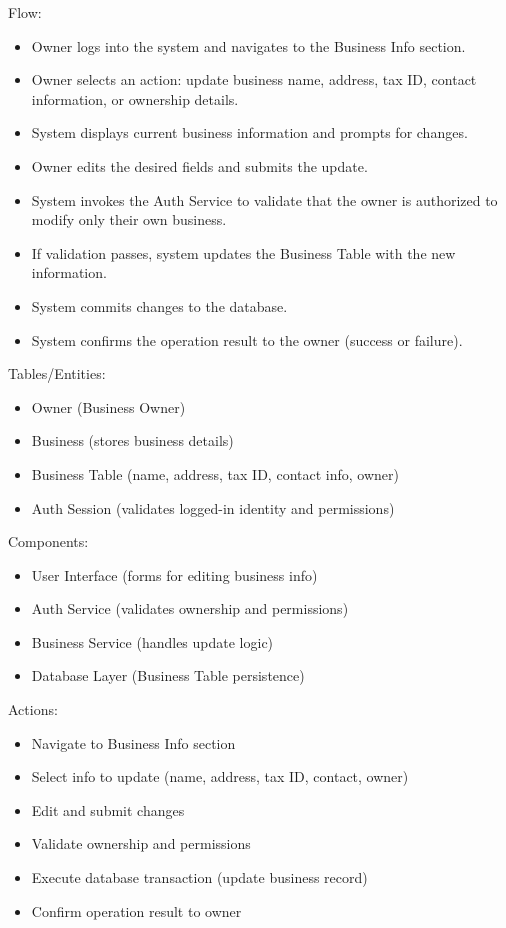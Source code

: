 \documentclass[]{VUMIFTemplateClass}
\begin{document}
Flow:
\begin{itemize}
    \setlength{\itemsep}{2pt}
    \setlength{\parskip}{0pt}
    \setlength{\parsep}{0pt}
    \item Owner logs into the system and navigates to the Business Info section.
    \item Owner selects an action: update business name, address, tax ID, contact information, or ownership details.
    \item System displays current business information and prompts for changes.
    \item Owner edits the desired fields and submits the update.
    \item System invokes the Auth Service to validate that the owner is authorized to modify only their own business.
    \item If validation passes, system updates the Business Table with the new information.
    \item System commits changes to the database.
    \item System confirms the operation result to the owner (success or failure).
\end{itemize}

Tables/Entities:
\begin{itemize}
    \setlength{\itemsep}{2pt}
    \setlength{\parskip}{0pt}
    \setlength{\parsep}{0pt}
    \item Owner (Business Owner)
    \item Business (stores business details)
    \item Business Table (name, address, tax ID, contact info, owner)
    \item Auth Session (validates logged-in identity and permissions)
\end{itemize}

Components:
\begin{itemize}
    \setlength{\itemsep}{2pt}
    \setlength{\parskip}{0pt}
    \setlength{\parsep}{0pt}
    \item User Interface (forms for editing business info)
    \item Auth Service (validates ownership and permissions)
    \item Business Service (handles update logic)
    \item Database Layer (Business Table persistence)
\end{itemize}

Actions:
\begin{itemize}
    \setlength{\itemsep}{2pt}
    \setlength{\parskip}{0pt}
    \setlength{\parsep}{0pt}
    \item Navigate to Business Info section
    \item Select info to update (name, address, tax ID, contact, owner)
    \item Edit and submit changes
    \item Validate ownership and permissions
    \item Execute database transaction (update business record)
    \item Confirm operation result to owner
\end{itemize}
\end{document}
